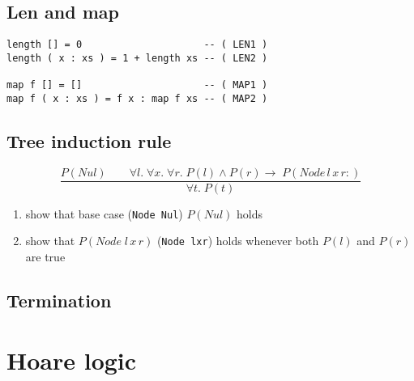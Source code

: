 \documentclass[10pt,a4paper,landscape]{article}
\begin{document}
\begin{multicols*}{3}
\subsection*{Len and map}
\begin{lstlisting}
length [] = 0                     -- ( LEN1 )
length ( x : xs ) = 1 + length xs -- ( LEN2 )

map f [] = []                     -- ( MAP1 )
map f ( x : xs ) = f x : map f xs -- ( MAP2 )
\end{lstlisting}

\subsection*{Tree induction rule}
\begin{displaymath}
\frac{P(Nul)\qquad \forall l.\; \forall x.\; \forall r.\; P(l) \land P(r) \rightarrow\; P(Node\,l\,x\,r:)}{\forall t.\; P(t)}
\end{displaymath}
\begin{enumerate}
\item show that base case (\verb|Node Nul|) $P(Nul)$ holds
\item show that $P(Node\;l\,x\,r)$ (\verb|Node lxr|) holds whenever both $P(l)$ and $P(r)$ are true
\end{enumerate}
\subsection*{Termination}

\section{Hoare logic}
%
\end{multicols*}
\end{document}
